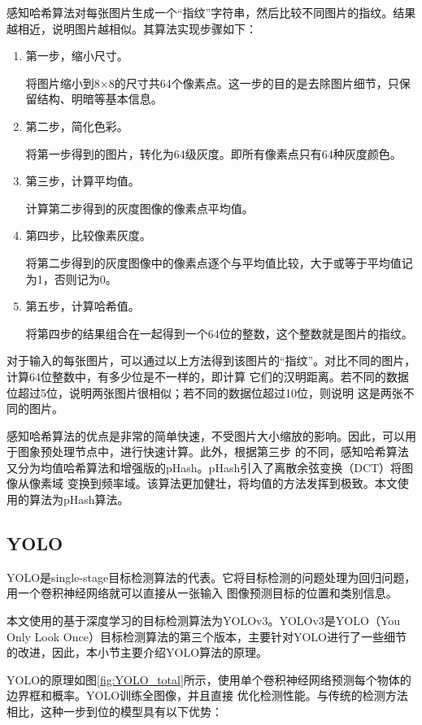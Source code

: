 感知哈希算法对每张图片生成一个“指纹”字符串，然后比较不同图片的指纹。结果越相近，说明图片越相似。其算法实现步骤如下：
\begin{enumerate}
    \item{第一步，缩小尺寸。
    
    将图片缩小到8×8的尺寸共64个像素点。这一步的目的是去除图片细节，只保留结构、明暗等基本信息。}
    \item{第二步，简化色彩。
    
    将第一步得到的图片，转化为64级灰度。即所有像素点只有64种灰度颜色。}
    \item{第三步，计算平均值。
    
    计算第二步得到的灰度图像的像素点平均值。}
    \item{第四步，比较像素灰度。
    
    将第二步得到的灰度图像中的像素点逐个与平均值比较，大于或等于平均值记为1，否则记为0。}
    \item{第五步，计算哈希值。
    
    将第四步的结果组合在一起得到一个64位的整数，这个整数就是图片的指纹。}
\end{enumerate}

对于输入的每张图片，可以通过以上方法得到该图片的“指纹”。对比不同的图片，计算64位整数中，有多少位是不一样的，即计算
它们的汉明距离\cite{hanming_distance}。若不同的数据位超过5位，说明两张图片很相似；若不同的数据位超过10位，则说明
这是两张不同的图片。

感知哈希算法的优点是非常的简单快速，不受图片大小缩放的影响。因此，可以用于图象预处理节点中，进行快速计算。此外，根据第三步
的不同，感知哈希算法又分为均值哈希算法和增强版的pHash\cite{pHash}。pHash引入了离散余弦变换\cite{DCT}（DCT）将图像从像素域
变换到频率域。该算法更加健壮，将均值的方法发挥到极致。本文使用的算法为pHash算法。

\subsection{YOLO}
YOLO是single-stage目标检测算法的代表。它将目标检测的问题处理为回归问题，用一个卷积神经网络就可以直接从一张输入
图像预测目标的位置和类别信息。

本文使用的基于深度学习的目标检测算法为YOLOv3。YOLOv3是YOLO（You Only Look Once）目标检测算法的第三个版本，主要针对YOLO进行了一些细节的改进，因此，本小节主要介绍YOLO算法的原理。

YOLO的原理如图\ref{fig:YOLO_total}\cite{YOLO2016}所示，使用单个卷积神经网络预测每个物体的边界框和概率。YOLO训练全图像，并且直接
优化检测性能。与传统的检测方法相比，这种一步到位的模型具有以下优势：

